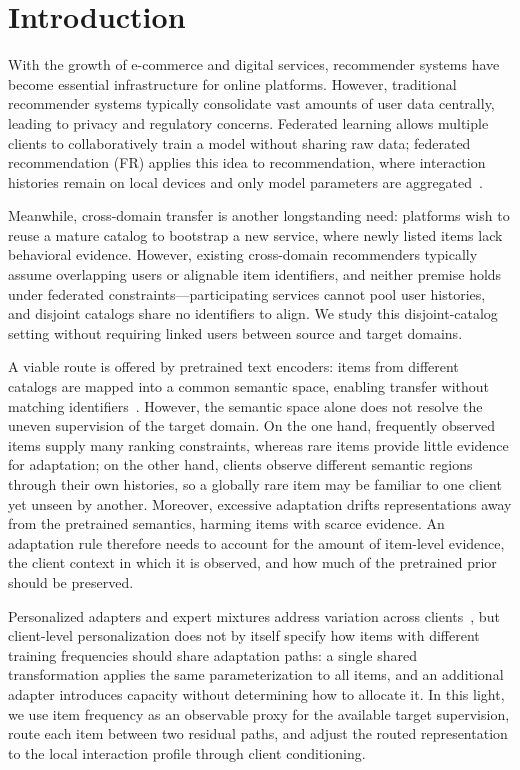 \section{Introduction}
\label{sec:intro}
With the growth of e-commerce and digital services, recommender systems have become essential infrastructure for online platforms. However, traditional recommender systems typically consolidate vast amounts of user data centrally, leading to privacy and regulatory concerns. Federated learning allows multiple clients to collaboratively train a model without sharing raw data; federated recommendation (FR) applies this idea to recommendation, where interaction histories remain on local devices and only model parameters are aggregated~\citep{ammad2019federated,mcmahan2017communication}.

Meanwhile, cross-domain transfer is another longstanding need: platforms wish to reuse a mature catalog to bootstrap a new service, where newly listed items lack behavioral evidence. However, existing cross-domain recommenders typically assume overlapping users or alignable item identifiers, and neither premise holds under federated constraints---participating services cannot pool user histories, and disjoint catalogs share no identifiers to align. We study this disjoint-catalog setting without requiring linked users between source and target domains.

A viable route is offered by pretrained text encoders: items from different catalogs are mapped into a common semantic space, enabling transfer without matching identifiers~\citep{zhang2026transfr}. However, the semantic space alone does not resolve the uneven supervision of the target domain. On the one hand, frequently observed items supply many ranking constraints, whereas rare items provide little evidence for adaptation; on the other hand, clients observe different semantic regions through their own histories, so a globally rare item may be familiar to one client yet unseen by another. Moreover, excessive adaptation drifts representations away from the pretrained semantics, harming items with scarce evidence. An adaptation rule therefore needs to account for the amount of item-level evidence, the client context in which it is observed, and how much of the pretrained prior should be preserved.

Personalized adapters and expert mixtures address variation across clients~\citep{li2026fedvlr,li2026fedpa}, but client-level personalization does not by itself specify how items with different training frequencies should share adaptation paths: a single shared transformation applies the same parameterization to all items, and an additional adapter introduces capacity without determining how to allocate it. In this light, we use item frequency as an observable proxy for the available target supervision, route each item between two residual paths, and adjust the routed representation to the local interaction profile through client conditioning.


